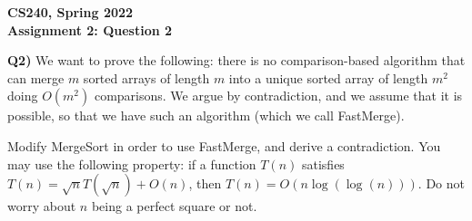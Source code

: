 \documentclass[12pt]{article}
\begin{document}
\begin{center}
{\Large\textbf{CS240, Spring 2022}}\\
\vspace{2mm}
{\Large\textbf{Assignment 2: Question 2}}\\
\vspace{3mm}
\end{center}
\[ \]
\textbf{Q2)} We want to prove the following: there is no comparison-based algorithm that can merge $m$ sorted arrays of length $m$ into a unique sorted
array of length $m^2$ doing $O(m^2)$ comparisons. We argue by
contradiction, and we assume that it is possible, so that we have such
an algorithm (which we call FastMerge).

Modify MergeSort in order to use FastMerge, and derive a
contradiction. You may use the following property: if a function
$T(n)$ satisfies $T(n) = \sqrt{n} T(\sqrt{n}) + O(n)$, then $T(n) =
O(n \log(\log(n)))$. Do not worry about $n$ being a perfect square or
not.\\
\end{document}
